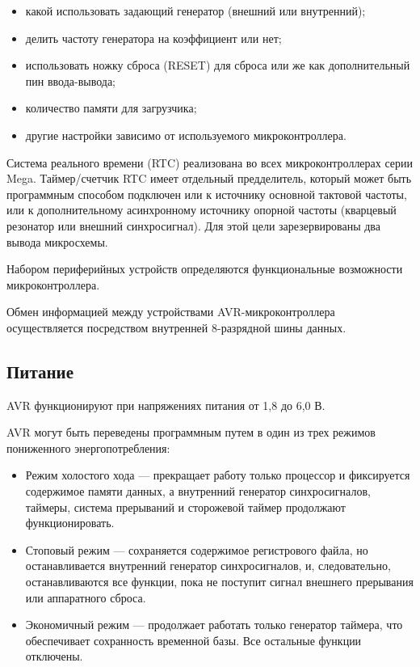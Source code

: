 \documentclass[12pt, oneside]{altsu-report}
\begin{document}
\begin{itemize}
    \item какой использовать задающий генератор (внешний или внутренний);

    \item делить частоту генератора на коэффициент или нет;

    \item использовать ножку сброса (RESET) для сброса или же как дополнительный пин ввода-вывода;

    \item количество памяти для загрузчика;

    \item другие настройки зависимо от используемого микроконтроллера.
\end{itemize}

Система реального времени (RTC) реализована во всех микроконтроллерах серии Mega. Таймер/счетчик RTC имеет отдельный предделитель, который может быть программным способом подключен или к источнику основной тактовой частоты, или к дополнительному асинхронному источнику опорной частоты (кварцевый резонатор или внешний синхросигнал). Для этой цели зарезервированы два вывода микросхемы. 

Набором периферийных устройств определяются функциональные возможности микроконтроллера.

Обмен информацией между устройствами AVR-микроконтроллера осуществляется посредством внутренней 8-разрядной шины данных.

\subsection{Питание}

AVR функционируют при напряжениях питания от 1,8 до 6,0 В.

AVR могут быть переведены программным путем в один из трех режимов пониженного энергопотребления:

\begin{itemize}
    \item Режим холостого хода --- прекращает работу только процессор и фиксируется содержимое памяти данных, а внутренний генератор синхросигналов, таймеры, система прерываний и сторожевой таймер продолжают функционировать.

    \item Стоповый режим --- сохраняется содержимое регистрового файла, но останавливается внутренний генератор синхросигналов, и, следовательно, останавливаются все функции, пока не поступит сигнал внешнего прерывания или аппаратного сброса.

    \item Экономичный режим --- продолжает работать только генератор таймера, что обеспечивает сохранность временной базы. Все остальные функции отключены.
\end{itemize}
\end{document}
